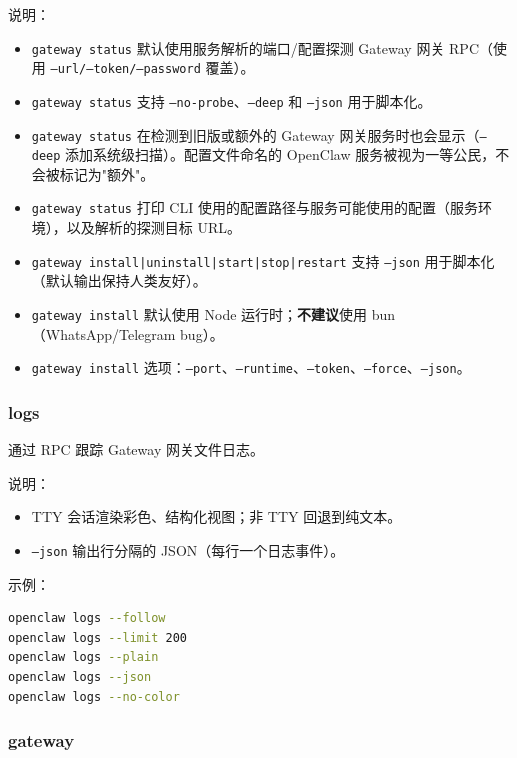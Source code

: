 说明：

\begin{itemize}
  \item \texttt{gateway status} 默认使用服务解析的端口/配置探测 Gateway 网关 RPC（使用 \texttt{--url/--token/--password} 覆盖）。
  \item \texttt{gateway status} 支持 \texttt{--no-probe}、\texttt{--deep} 和 \texttt{--json} 用于脚本化。
  \item \texttt{gateway status} 在检测到旧版或额外的 Gateway 网关服务时也会显示（\texttt{--deep} 添加系统级扫描）。配置文件命名的 OpenClaw 服务被视为一等公民，不会被标记为"额外"。
  \item \texttt{gateway status} 打印 CLI 使用的配置路径与服务可能使用的配置（服务环境），以及解析的探测目标 URL。
  \item \texttt{gateway install|uninstall|start|stop|restart} 支持 \texttt{--json} 用于脚本化（默认输出保持人类友好）。
  \item \texttt{gateway install} 默认使用 Node 运行时；\textbf{不建议}使用 bun（WhatsApp/Telegram bug）。
  \item \texttt{gateway install} 选项：\texttt{--port}、\texttt{--runtime}、\texttt{--token}、\texttt{--force}、\texttt{--json}。
\end{itemize}


\subsubsection{logs}


通过 RPC 跟踪 Gateway 网关文件日志。

说明：

\begin{itemize}
  \item TTY 会话渲染彩色、结构化视图；非 TTY 回退到纯文本。
  \item \texttt{--json} 输出行分隔的 JSON（每行一个日志事件）。
\end{itemize}


示例：

\begin{lstlisting}[language=bash]
openclaw logs --follow
openclaw logs --limit 200
openclaw logs --plain
openclaw logs --json
openclaw logs --no-color
\end{lstlisting}


\subsubsection{gateway }


